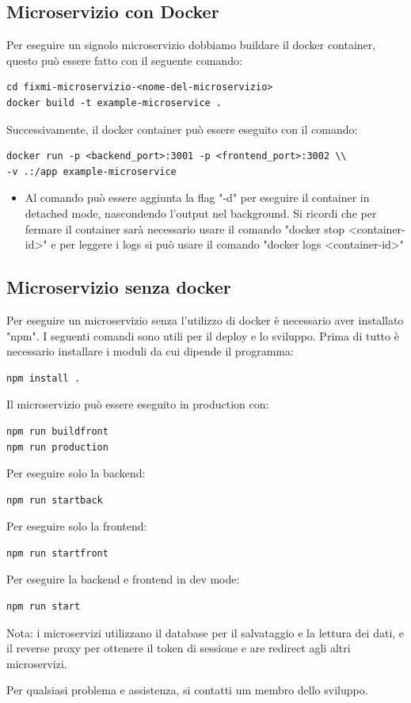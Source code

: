 \documentclass{report}
\begin{document}
\subsection*{Microservizio con Docker}
Per eseguire un signolo microservizio dobbiamo buildare il docker container, questo può essere fatto con il seguente comando:
\begin{verbatim}
cd fixmi-microservizio-<nome-del-microservizio>
docker build -t example-microservice .
\end{verbatim}
Successivamente, il docker container può essere eseguito con il comando:
\begin{verbatim}
docker run -p <backend_port>:3001 -p <frontend_port>:3002 \\
-v .:/app example-microservice
\end{verbatim}
\begin{itemize}
	\item Al comando può essere aggiunta la flag "-d" per eseguire il container in detached mode, nascondendo l'output nel background. Si ricordi che per fermare il container sarà necessario usare il comando "docker stop <container-id>" e per leggere i logs si può usare il comando "docker logs <container-id>"
\end{itemize}

\subsection*{Microservizio senza docker}
Per eseguire un microservizio senza l'utilizzo di docker è necessario aver installato "npm". I seguenti comandi sono utili per il deploy e lo sviluppo.
Prima di tutto è necessario installare i moduli da cui dipende il programma:
\begin{verbatim}
npm install .
\end{verbatim}
Il microservizio può essere eseguito in production con:
\begin{verbatim}
npm run buildfront
npm run production
\end{verbatim}
Per eseguire solo la backend:
\begin{verbatim}
npm run startback
\end{verbatim}
Per eseguire solo la frontend:
\begin{verbatim}
npm run startfront
\end{verbatim}
Per eseguire la backend e frontend in dev mode:
\begin{verbatim}
npm run start
\end{verbatim}
Nota: i microservizi utilizzano il database per il salvataggio e la lettura dei dati, e il reverse proxy per ottenere il token di sessione e are redirect agli altri microservizi.

Per qualsiasi problema e assistenza, si contatti um membro dello sviluppo.
\end{document}
